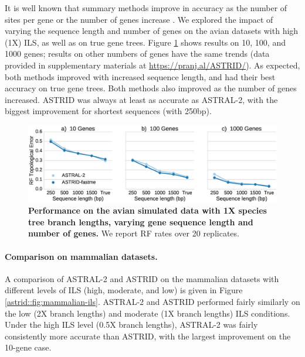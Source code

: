 It is well known that summary methods improve in accuracy as the
number of sites per gene or the number of genes increase
\cite{mirarab2014evaluating,GatesyMPE2014,bayzid2013naive,roch2015robustness}.  We
explored the impact of varying the sequence length and number of genes
on the avian datasets with high (1X) ILS, as well as on true gene
trees.  Figure \ref{astrid::fig:avian-seqlength} shows results on 10, 100, and
1000 genes; results on other numbers of genes have the same trends
(data provided in supplementary materials at \url{https://pranj.al/ASTRID/}).
As expected, both methods improved
with increased sequence length, and had their best accuracy on
true gene trees.
Both methods also improved as the number of genes increased. 
ASTRID
was always at least as accurate as ASTRAL-2,
with the biggest improvement for shortest
sequences (with 250bp). 
 

\begin{figure}
  \centering
  \includegraphics[width=12cm]{astrid-figs/avian-seqlength-main.eps}
  \caption[Performance on the avian simulated data with 1X
      species tree branch lengths]{\textbf{Performance on the avian simulated data with 1X
      species tree branch lengths, varying gene sequence length and
      number of genes.} We report RF  rates over 20
    replicates.}
  \label{astrid::fig:avian-seqlength}
\end{figure}

\paragraph{Comparison on mammalian datasets. }
A comparison of ASTRAL-2 
 and ASTRID on the mammalian datasets
with different levels of ILS (high, moderate, and low)
is given in 
Figure \ref{astrid::fig:mammalian-ils}.
ASTRAL-2 
 and ASTRID performed
fairly similarly on the low (2X branch lengths) and moderate (1X branch
lengths) ILS conditions. Under the high ILS level (0.5X branch lengths), ASTRAL-2 
 was fairly consistently more accurate than ASTRID, with the largest
improvement on the 10-gene case.


